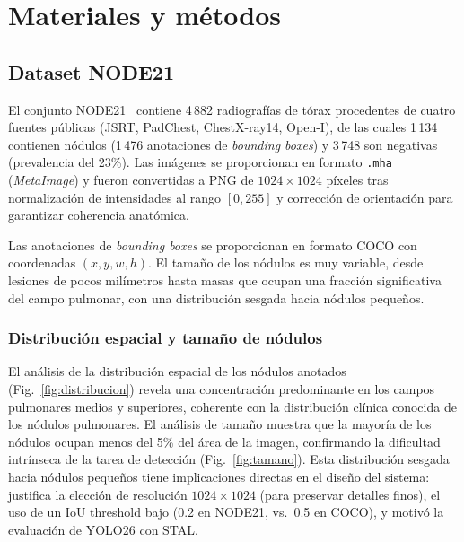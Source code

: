 \documentclass[conference]{IEEEtran}
\begin{document}
\section{Materiales y m\'{e}todos}

\subsection{Dataset NODE21}

El conjunto NODE21~\cite{node21challenge} contiene 4\,882 radiograf\'{i}as de
t\'{o}rax procedentes de cuatro fuentes p\'{u}blicas (JSRT, PadChest,
ChestX-ray14, Open-I), de las cuales 1\,134 contienen n\'{o}dulos (1\,476
anotaciones de \textit{bounding boxes}) y 3\,748 son negativas (prevalencia del
23\%). Las im\'{a}genes se proporcionan en formato \texttt{.mha}
(\textit{MetaImage}) y fueron convertidas a PNG de $1024 \times 1024$
p\'{i}xeles tras normalizaci\'{o}n de intensidades al rango $[0, 255]$ y
correcci\'{o}n de orientaci\'{o}n para garantizar coherencia anat\'{o}mica.

Las anotaciones de \textit{bounding boxes} se proporcionan en formato COCO con
coordenadas $(x, y, w, h)$. El tama\~{n}o de los n\'{o}dulos es muy variable,
desde lesiones de pocos mil\'{i}metros hasta masas que ocupan una fracci\'{o}n
significativa del campo pulmonar, con una distribuci\'{o}n sesgada hacia
n\'{o}dulos peque\~{n}os.

\subsubsection{Distribuci\'{o}n espacial y tama\~{n}o de n\'{o}dulos}

El an\'{a}lisis de la distribuci\'{o}n espacial de los n\'{o}dulos anotados
(Fig.~\ref{fig:distribucion}) revela una concentraci\'{o}n predominante en los
campos pulmonares medios y superiores, coherente con la distribuci\'{o}n
cl\'{i}nica conocida de los n\'{o}dulos pulmonares. El an\'{a}lisis de
tama\~{n}o muestra que la mayor\'{i}a de los n\'{o}dulos ocupan menos del 5\%
del \'{a}rea de la imagen, confirmando la dificultad intr\'{i}nseca de la tarea
de detecci\'{o}n (Fig.~\ref{fig:tamano}). Esta distribuci\'{o}n sesgada hacia
n\'{o}dulos peque\~{n}os tiene implicaciones directas en el dise\~{n}o del
sistema: justifica la elecci\'{o}n de resoluci\'{o}n $1024 \times 1024$ (para
preservar detalles finos), el uso de un IoU threshold bajo (0.2 en NODE21, vs.\
0.5 en COCO), y motiv\'{o} la evaluaci\'{o}n de YOLO26 con STAL.
\end{document}
